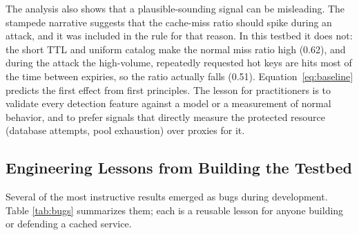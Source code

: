 \documentclass[preprint,12pt]{elsarticle}
\begin{document}
The analysis also shows that a plausible-sounding signal can be misleading. The
stampede narrative suggests that the cache-miss ratio should spike during an attack,
and it was included in the rule for that reason. In this testbed it does not: the short
TTL and uniform catalog make the normal miss ratio high (0.62), and during the attack
the high-volume, repeatedly requested hot keys are hits most of the time between
expiries, so the ratio actually falls (0.51). Equation~\eqref{eq:baseline} predicts the
first effect from first principles. The lesson for practitioners is to validate every
detection feature against a model or a measurement of normal behavior, and to prefer
signals that directly measure the protected resource (database attempts, pool
exhaustion) over proxies for it.

\subsection{Engineering Lessons from Building the Testbed}
\label{sec:lessons}
Several of the most instructive results emerged as bugs during development. Table
\ref{tab:bugs} summarizes them; each is a reusable lesson for anyone building or
defending a cached service.
\end{document}
